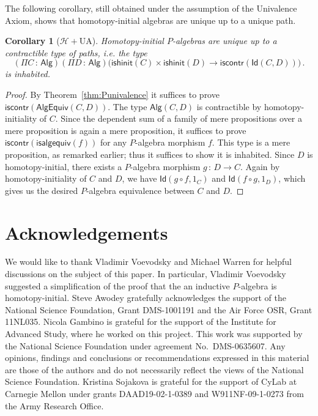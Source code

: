 \documentclass[10pt,a4paper,oneside,reqno]{amsart}
\numberwithin{equation}{section}
\theoremstyle{mythm}
\newtheorem{corollary}[theorem]{Corollary}
\theoremstyle{mydef}
\theoremstyle{myrmk}
\newcommand{\co}{\,{:}\,}
\newcommand{\Hint}{\mathcal{H}}
\newcommand{\UA}{\mathrm{UA}}
\newcommand{\iscontr}{\mathsf{iscontr}}
\newcommand{\isalghinit}{\mathsf{ishinit}}
\newcommand{\Id}{\mathsf{Id}}
\newcommand{\Palg}{\mathsf{Alg}}
\newcommand{\isalgequiv}{\mathsf{isalgequiv}}
\newcommand{\AlgEquiv}{\mathsf{AlgEquiv}}
\begin{document}
The following corollary, still obtained under the assumption of the Univalence Axiom, shows that
homotopy-initial algebras are unique up to a unique path.

\begin{corollary}[$\Hint + \UA$] \label{WHInitIso}
Homotopy-initial $P$-algebras are unique up to a  contractible type of paths, i.e. the type
\[ 
(\Pi C \co \Palg) (\Pi D \co \Palg) \big( \isalghinit(C) \times \isalghinit(D)  \to 
\iscontr(\Id(C,D)) \big) \, .
\] 
is inhabited.
\end{corollary}

\begin{proof}
By Theorem~\ref{thm:Punivalence} it suffices to prove $\iscontr(\AlgEquiv(C,D))$. The type $\Palg(C,D)$ is contractible by homotopy-initiality of $C$. Since the dependent sum of a family of mere propositions over a mere proposition is again a mere proposition, it suffices to prove $\iscontr(\isalgequiv(f))$ for any $P$-algebra morphism $f$. This type is a mere proposition, as remarked earlier; thus it suffices to show it is inhabited.
Since $D$ is homotopy-initial, there exists a $P$-algebra morphism $g \co D \to C$. Again by homotopy-initiality of $C$ and 
$D$, we have $\Id(g \circ f, 1_C)$ and $\Id(f \circ g, 1_D)$, which gives us the desired $P$-algebra equivalence between 
$C$ and $D$.
\end{proof}



\section*{Acknowledgements}

We would like to thank Vladimir Voevodsky and Michael Warren for helpful discussions
on the subject of this paper. In particular, Vladimir Voevodsky suggested a simplification of the 
proof that the an inductive $P$-algebra is homotopy-initial.
 Steve Awodey gratefully acknowledges the support of the National Science Foundation, Grant DMS-1001191 and the Air Force OSR, Grant 11NL035. Nicola Gambino is grateful for the support of the Institute for Advanced Study, where
he worked on this project. This work was supported by the National Science Foundation 
under agreement No.\ DMS-0635607. Any opinions, findings and conclusions or recommendations
expressed in this material are those of the authors and do not necessarily reflect the views of
the National Science Foundation. Kristina Sojakova is grateful for the support of CyLab at Carnegie
Mellon under grants DAAD19-02-1-0389 and W911NF-09-1-0273 from the Army
Research Office.











                        
\end{document}
